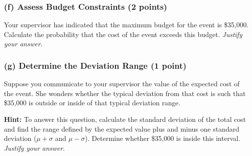 \documentclass{article}
\begin{document}
\begin{center}
 \end{center}

\subsubsection*{(f) Assess Budget Constraints (2 points)}
Your supervisor has indicated that the maximum budget for the event is \$35,000. Calculate the probability that the cost of the event exceeds this budget. \emph{Justify your answer}.

\begin{center}
 \end{center}



\subsubsection*{(g) Determine the Deviation Range (1 point)}
Suppose you communicate to your supervisor the value of the expected cost of the event. She wonders whether the typical deviation from that cost is such that \$35,000 is outside or inside of that typical deviation range.

\textbf{Hint:} To answer this question, calculate the standard deviation of the total cost and find the range defined by the expected value plus and minus one standard deviation ($\mu + \sigma$ and $\mu - \sigma$). Determine whether \$35,000 is inside this interval. \emph{Justify your answer}.

\begin{center}
 \end{center}
\end{document}
